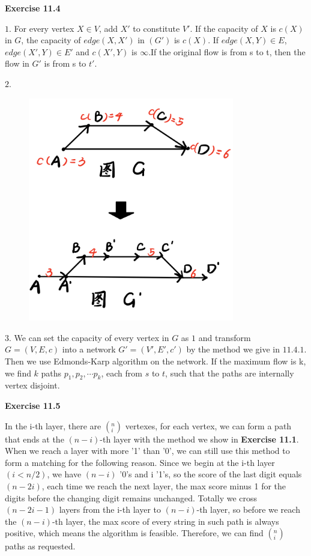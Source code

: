 \documentclass{article} %
\begin{document}
\textbf{Exercise 11.4}\par
    $1.$ For every vertex $X \in V$, add $X\prime$ to constitute $V\prime$. If the capacity of $X$ is $c(X)$ in $G$, the capacity of $edge(X,X\prime)$ in $(G\prime)$ is $c(X).$ If $edge(X,Y)\in E$, $edge(X\prime,Y)\in E\prime$ and $c(X\prime,Y)$ is $\infty$.If the original flow is from s to t, then the flow in $G\prime$ is from s to $t\prime$.\par
    $2.$
    \begin{figure}[H]
  	\centering
  	\includegraphics[width=9cm]{11_4_2.png}
  	\caption{}
  	\label{}
  	\end{figure}


    $3.$ We can set the capacity of every vertex in $G$ as $1$ and transform $G = (V,E,c)$ into a network $G\prime = (V\prime,E\prime,c\prime)$ by the method we give in $11.4.1$. Then we use Edmonds-Karp algorithm on the network. If the maximum flow is k, we find $k$ paths $p_1,p_2,\cdots p_k$, each from $s$ to $t$, such that the paths are internally vertex disjoint.\par

 \textbf{Exercise 11.5}\par	
	In the i-th layer, there are $(^n _i)$ vertexes, for each vertex, we can form a path that ends at the $(n-i)$-th layer with the method we show in \textbf{Exercise 11.1}. When we reach a layer with more '1' than '0', we can still use this method to form a matching for the following reason. Since we begin at the i-th layer$(i<n/2)$, we have $(n-i)$ '0's and i '1's, so the score of the last digit equals $(n-2i)$, each time we reach the next layer, the max score minus 1 for the  digits before the changing digit remains unchanged. Totally we cross $(n-2i-1)$ layers from the i-th layer to $(n-i)$-th layer, so before we reach the $(n-i)$-th layer, the max score of every string in such path is always positive, which means the algorithm is feasible. Therefore, we can find $(^n _i)$ paths as requested.\par
\end{document}

